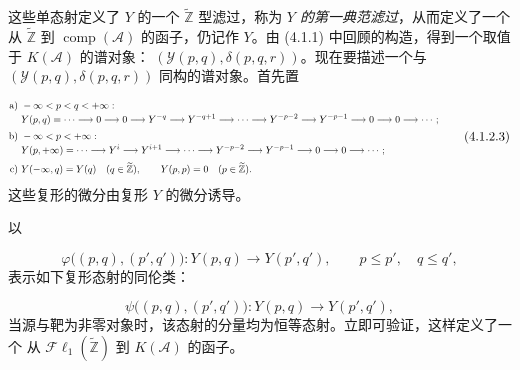 \clearpage
{}%
\begingroup\small\setlength{\parskip}{0pt}\setlength{\emergencystretch}{1.5em}
\setlength{\abovedisplayskip}{4pt plus 2pt minus 2pt}%
\setlength{\belowdisplayskip}{4pt plus 2pt minus 2pt}%

这些单态射定义了 $Y$ 的一个 $\widetilde{\mathbb Z}$ 型滤过，称为
\emph{$Y$ 的第一典范滤过}，从而定义了一个从
$\widetilde{\mathbb Z}$ 到 $\operatorname{comp}(\mathcal A)$ 的函子，仍记作
$Y$。由 (4.1.1) 中回顾的构造，得到一个取值于 $K(\mathcal A)$ 的谱对象：
$(\mathcal Y(p,q),\delta(p,q,r))$。现在要描述一个与
$(\mathcal Y(p,q),\delta(p,q,r))$ 同构的谱对象。首先置

\begin{equation}
\resizebox{0.98\textwidth}{!}{%
$\displaystyle
\begin{aligned}
\text{a) }& -\infty<p<q<+\infty:\\[-2pt]
&Y(p,q)=\cdots\longrightarrow0\longrightarrow0\longrightarrow Y^{-q}
\longrightarrow Y^{-q+1}\longrightarrow\cdots\longrightarrow Y^{-p-2}
\longrightarrow Y^{-p-1}\longrightarrow0\longrightarrow0
\longrightarrow\cdots;\\[2pt]
\text{b) }& -\infty<p<+\infty:\\[-2pt]
&Y(p,+\infty)=\cdots\longrightarrow Y^i\longrightarrow Y^{i+1}
\longrightarrow\cdots\longrightarrow Y^{-p-2}\longrightarrow Y^{-p-1}
\longrightarrow0\longrightarrow0\longrightarrow\cdots;\\[2pt]
\text{c) }&Y(-\infty,q)=Y(q)\quad(q\in\widetilde{\mathbb Z}),\qquad
Y(p,p)=0\quad(p\in\widetilde{\mathbb Z}).
\end{aligned}$%
}
\tag{4.1.2.3}
\end{equation}
这些复形的微分由复形 $Y$ 的微分诱导。

以

\begin{equation}
\varphi\bigl((p,q),(p',q')\bigr)\colon
Y(p,q)\longrightarrow Y(p',q'),\qquad p\leq p',\quad q\leq q',
\tag{4.1.2.4}
\end{equation}
表示如下复形态射的同伦类：

\begin{equation}
\psi\bigl((p,q),(p',q')\bigr)\colon
Y(p,q)\longrightarrow Y(p',q'),
\tag{4.1.2.5}
\end{equation}
当源与靶为非零对象时，该态射的分量均为恒等态射。立即可验证，这样定义了一个
从 $\mathcal{F}\ell_1(\widetilde{\mathbb Z})$ 到 $K(\mathcal A)$ 的函子。

